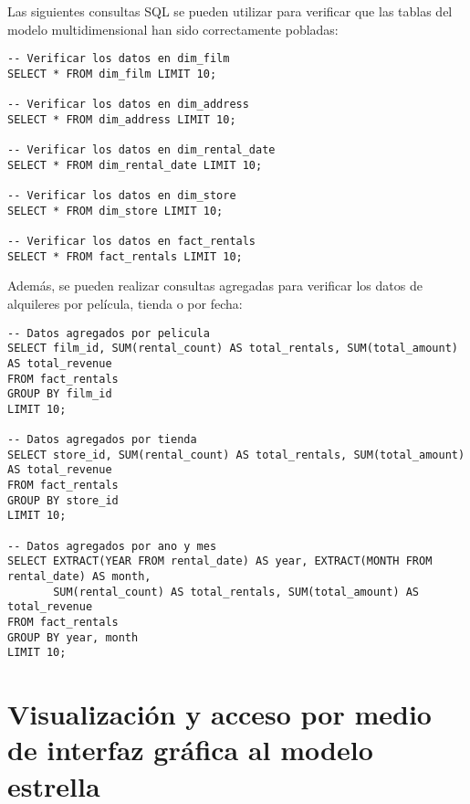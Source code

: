 \documentclass{article}
\begin{document}
Las siguientes consultas SQL se pueden utilizar para verificar que las tablas del modelo multidimensional han sido correctamente pobladas:

\begin{lstlisting}
-- Verificar los datos en dim_film
SELECT * FROM dim_film LIMIT 10;

-- Verificar los datos en dim_address
SELECT * FROM dim_address LIMIT 10;

-- Verificar los datos en dim_rental_date
SELECT * FROM dim_rental_date LIMIT 10;

-- Verificar los datos en dim_store
SELECT * FROM dim_store LIMIT 10;

-- Verificar los datos en fact_rentals
SELECT * FROM fact_rentals LIMIT 10;
\end{lstlisting}

Además, se pueden realizar consultas agregadas para verificar los datos de alquileres por película, tienda o por fecha:

\begin{lstlisting}
-- Datos agregados por pelicula
SELECT film_id, SUM(rental_count) AS total_rentals, SUM(total_amount) AS total_revenue
FROM fact_rentals
GROUP BY film_id
LIMIT 10;

-- Datos agregados por tienda
SELECT store_id, SUM(rental_count) AS total_rentals, SUM(total_amount) AS total_revenue
FROM fact_rentals
GROUP BY store_id
LIMIT 10;

-- Datos agregados por ano y mes
SELECT EXTRACT(YEAR FROM rental_date) AS year, EXTRACT(MONTH FROM rental_date) AS month, 
       SUM(rental_count) AS total_rentals, SUM(total_amount) AS total_revenue
FROM fact_rentals
GROUP BY year, month
LIMIT 10;
\end{lstlisting}

\newpage
\section{Visualización y acceso por medio de interfaz gráfica al modelo estrella}

\end{document}
